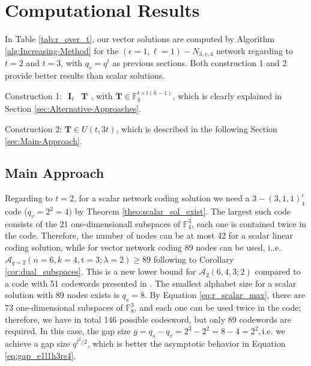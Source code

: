 \chapter{Computational Results} \label{chap:comp_method}

In Table \ref{tab:r_over_t}, our vector solutions are computed by
Algorithm \ref{alg:Increasing-Method} for the $\left(\epsilon=1,\ell=1\right)-\ensuremath{N}_{3,r,4}$
network regarding to $t=2$ and $t=3$, with $q_{v}=q^{t}$ as previous
sections. Both construction 1 and 2 provide better results than scalar
solutions. 

Construction 1: $\begin{array}{c|c}
\boldsymbol{I}_{t} & \boldsymbol{T}\end{array}$, with $\boldsymbol{T}\in\ensuremath{\mathbb{F}}_{q}^{t\times t\left(h-1\right)}$,
which is clearly explained in Section \ref{sec:Alternative-Approaches}.

Construction 2: $\boldsymbol{T}\in U\left(t,3t\right)$, which is
described in the following Section \ref{sec:Main-Approach}.

\section{Main Approach \label{sec:Main-Approach}}

Regarding to $t=2$, for a scalar network coding solution we need
a $3-\left(3,1,1\right)_{4}^{c}$ code ($q_{v}=2^{2}=4)$ by Theorem
\ref{theo:scalar_sol_exist}. The largest such code consists of the
21 one-dimensionall subspaces of $\ensuremath{\mathbb{F}}_{4}^{3}$,
each one is contained twice in the code. Therefore, the number of
nodes can be at most 42 for a scalar linear coding solution, while
for vector network coding 89 nodes can be used, i..e. $\mathcal{A}_{q=2}\left(n=6,k=4,\mathrm{t}=3;\lambda=2\right)\geq89$
following to Corollary \ref{cor:dual_subspaces}. This is a new lower
bound for $\mathcal{A}_{2}\left(6,4,3;2\right)$ compared to a code
with 51 codewords presented in \cite{Wachter-Zeh:2018}. The smallest
alphabet size for a scalar solution with 89 nodes exists is $q_{s}=8$.
By Equation \ref{eq:r_scalar_max}, there are 73 one-dimensional subspaces
of $\ensuremath{\mathbb{F}}_{8}^{3}$, and each one can be used twice
in the code; therefore, we have in total 146 possible codesword, but
only 89 codewords are required. In this case, the gap size $g=q_{s}-q_{v}=2^{3}-2^{2}=8-4=2^{2},$i.e.
we achieve a gap size $q^{t^{2}/2}$, which is better the asymptotic
behavior in Equation \ref{eq:gap_e1l1h3rs4}. 


